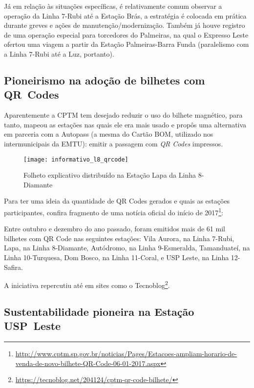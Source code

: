 \documentclass[11pt,fleqn]{book} %
\begin{document}
Já em relação às situações específicas, é relativamente comum observar a operação da Linha 7-Rubi até a Estação Brás, a estratégia é colocada em prática durante greves e ações de manutenção/modernização. Também já houve registro de uma operação especial para torcedores do Palmeiras, na qual o Expresso Leste ofertou uma viagem a partir da Estação Palmeiras-Barra Funda (paralelismo com a Linha 7-Rubi até a Luz, portanto).

\subsection{Pioneirismo na adoção de bilhetes com QR Codes}

Aparentemente a CPTM tem desejado reduzir o uso do bilhete magnético, para tanto, mapeou as estações nas quais ele era mais usado e propôs uma alternativa em parceria com a Autopass (a mesma do Cartão BOM, utilizado nos intermunicipais da EMTU): emitir a passagem com \textit{QR Codes} impressos.

\begin{figure}[htb]
	\centering
	\texttt{[image: informativo\_l8\_qrcode]}
	\caption[Informativo QR Codes]{Folheto explicativo distribuído na Estação Lapa da Linha 8-Diamante}
	\label{fig:l8_qr}
\end{figure}

Para ter uma ideia da quantidade de QR Codes gerados e quais as estações participantes, confira fragmento de uma notícia oficial do início de 2017\footnote{\url{http://www.cptm.sp.gov.br/noticias/Pages/Estacoes-ampliam-horario-de-venda-de-novo-bilhete-QR-Code-06-01-2017.aspx}}:

\begin{citacao}
	Entre outubro e dezembro do ano passado, foram emitidos mais de 61 mil bilhetes com QR Code nas seguintes estações: Vila Aurora, na Linha 7-Rubi, Lapa, na Linha 8-Diamante, Autódromo, na Linha 9-Esmeralda, Tamanduateí, na Linha 10-Turquesa, Dom Bosco, na Linha 11-Coral, e USP Leste, na Linha 12-Safira.
\end{citacao}

A iniciativa repercutiu até em sites como o Tecnoblog\footnote{\url{https://tecnoblog.net/204124/cptm-qr-code-bilhete/}}.

\subsection{Sustentabilidade pioneira na Estação USP Leste}
\end{document}
